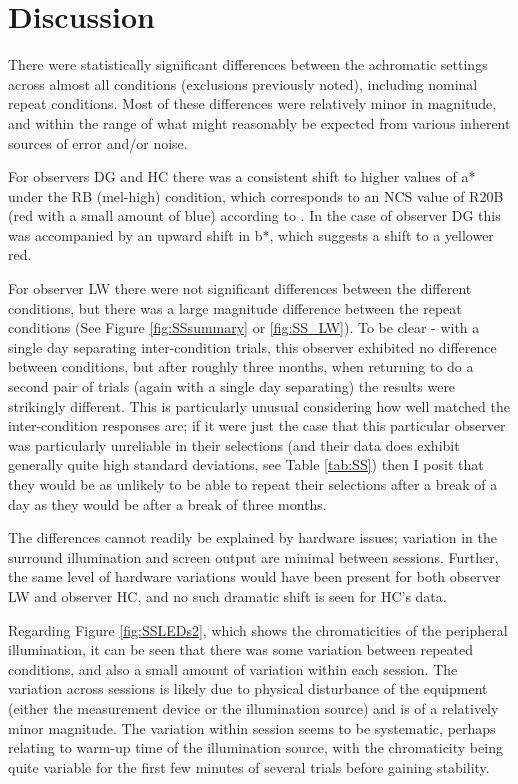 \clearpage

\section{Discussion}

There were statistically significant differences between the achromatic settings across almost all conditions (exclusions previously noted), including nominal repeat conditions. Most of these differences were relatively minor in magnitude, and within the range of what might reasonably be expected from various inherent sources of error and/or noise.

For observers DG and HC there was a consistent shift to higher values of a* under the RB (mel-high) condition, which corresponds to an NCS value of R20B (red with a small amount of blue) according to \citet{derefeldt_transformation_1986}. In the case of observer DG this was accompanied by an upward shift in b*, which suggests a shift to a yellower red.

For observer LW there were not significant differences between the different conditions, but there was a large magnitude difference between the repeat conditions (See Figure \ref{fig:SSsummary} or \ref{fig:SS_LW}). To be clear - with a single day separating inter-condition trials, this observer exhibited no difference between conditions, but after roughly three months, when returning to do a second pair of trials (again with a single day separating) the results were strikingly different. This is particularly unusual considering how well matched the inter-condition responses are; if it were just the case that this particular observer was particularly unreliable in their selections (and their data does exhibit generally quite high standard deviations, see Table \ref{tab:SS}) then I posit that they would be as unlikely to be able to repeat their selections after a break of a day as they would be after a break of three months.

The differences cannot readily be explained by hardware issues; variation in the surround illumination and screen output are minimal between sessions. Further, the same level of hardware variations would have been present for both observer LW and observer HC, and no such dramatic shift is seen for HC's data.

Regarding Figure \ref{fig:SSLEDs2}, which shows the chromaticities of the peripheral illumination, it can be seen that there was some variation between repeated conditions, and also a small amount of variation within each session. The variation across sessions is likely due to physical disturbance of the equipment (either the measurement device or the illumination source) and is of a relatively minor magnitude. The variation within session seems to be systematic, perhaps relating to warm-up time of the illumination source, with the chromaticity being quite variable for the first few minutes of several trials before gaining stability.

